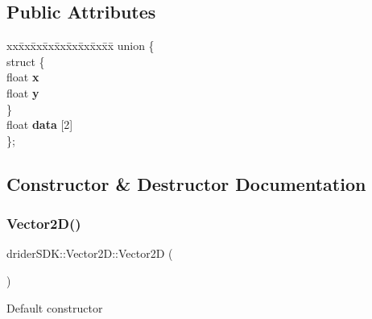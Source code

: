 \subsection*{Public Attributes}
\begin{DoxyCompactItemize}
\item 
\mbox{\label{classdrider_s_d_k_1_1_vector2_d_ab0c08edfe68a30a224eeea9a2279aef6}} 
\begin{tabbing}
xx\=xx\=xx\=xx\=xx\=xx\=xx\=xx\=xx\=\kill
union \{\\
\mbox{\label{uniondrider_s_d_k_1_1_vector2_d_1_1_0D12_a193ac01cb09cbf0192c8d49eafc6094b}} 
\>struct \{\\
\>\>float {\bfseries x}\\
\>\>float {\bfseries y}\\
\>\} \\
\>float {\bfseries data} \mbox{[}2\mbox{]}\\
\}; \\

\end{tabbing}\end{DoxyCompactItemize}


\subsection{Constructor \& Destructor Documentation}
\mbox{\label{classdrider_s_d_k_1_1_vector2_d_aba8cc384436dbc1f1b35ee12e9289c96}} 
\subsubsection{\texorpdfstring{Vector2\+D()}{Vector2D()}\hspace{0.1cm}{\footnotesize\ttfamily [1/5]}}
{\footnotesize\ttfamily drider\+S\+D\+K\+::\+Vector2\+D\+::\+Vector2D (\begin{DoxyParamCaption}{ }\end{DoxyParamCaption})}

Default constructor \mbox{\label{classdrider_s_d_k_1_1_vector2_d_adf3c51c5f539f2dab7bfb5c6f0de3b1f}} 
